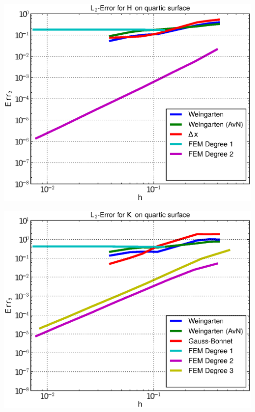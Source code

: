 \documentclass{beamer}
\begin{document}
\begin{frame}
\begin{overprint}
\begin{minipage}[t]{0.49\textwidth}
            \centering\includegraphics[width=\textwidth]{bilder/Curvature/heineB/ErrHL2_5.eps}
          \end{minipage}
          \begin{minipage}[t]{0.49\textwidth}
            \centering\includegraphics[width=\textwidth]{bilder/Curvature/heineB/ErrKL2_6.eps}
          \end{minipage}\hfill
          \begin{minipage}[t]{0.49\textwidth}

\end{minipage}
\end{overprint}
\end{frame}
\end{document}
